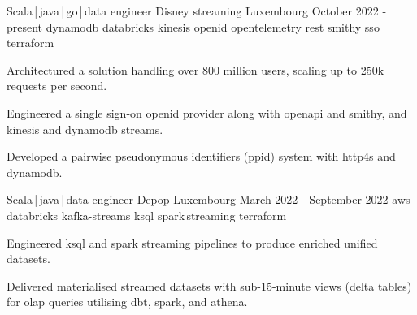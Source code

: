 
\newcommand*{\logo}[2]{\raisebox{-0.2em}{\texttt{[image: \#2]}}\hspace{0.25em}#1}
\newcommand*{\logoonly}[1]{\raisebox{-0.2em}{\texttt{[image: \#1]}}}


\begin{cventries}
    \cventry
    {Scala\,|\,java\,|\,go\,|\,data engineer}
    {\logo{Disney streaming}{../../../images/disney.png}} %
    {Luxembourg} %
    {October 2022 - present} %
    {dynamodb {} databricks {} kinesis {} openid {}  opentelemetry {} rest {} smithy {} sso {} terraform}
    {
        \begin{cvitems}
            \item{Architectured a solution handling over 800 million users, scaling up to 250k requests per second.}
            \item{Engineered a single sign-on openid provider along with openapi and smithy, and kinesis and dynamodb streams.}
            \item{Developed a pairwise pseudonymous identifiers (ppid) system with http4s and dynamodb.}
        \end{cvitems}
    }

    \cventry
    {Scala\,|\,java\,|\,data engineer}
    {\logo{Depop}{../../../images/depop.jpg}} %
    {Luxembourg} %
    {March 2022 - September 2022} %
    {aws {} databricks {} kafka-streams {} ksql {} spark\,streaming {} terraform}
    {
        \begin{cvitems}
            \item{Engineered ksql and spark streaming pipelines to produce enriched unified datasets.}
            \item{Delivered materialised streamed datasets with sub-15-minute views (delta tables) for olap queries utilising dbt, spark, and athena.}
        \end{cvitems}
    }



\end{cventries}
